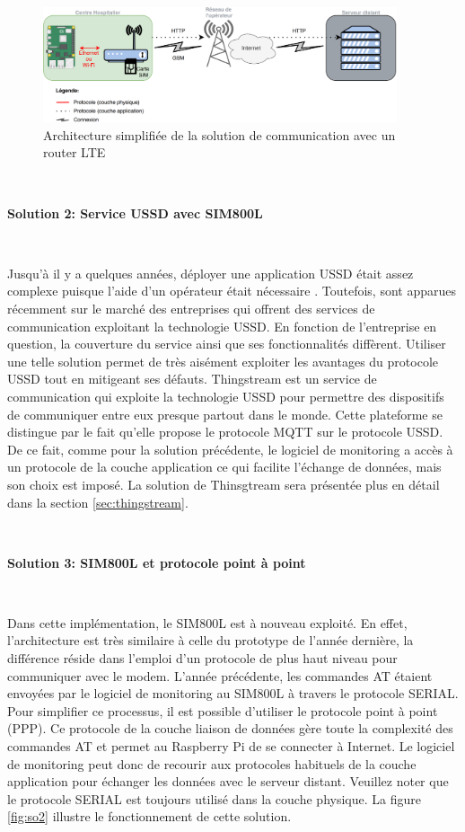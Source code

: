 \begin{figure}[ht!]
  \centering
  \includegraphics[width=0.93\textwidth]{img/el_prototype/solution1_com.png}
  \caption{Architecture simplifiée de la solution de communication avec un router LTE}
  \label{fig:so1}
\end{figure}

~

\textbf{Solution 2: Service USSD avec SIM800L}

\vspace{-0.2cm}
~

\noindent
Jusqu'à il y a quelques années, déployer une application USSD était assez complexe puisque l'aide d'un opérateur était nécessaire \cite{perrier2015ussd}. Toutefois, sont apparues récemment sur le marché des entreprises qui offrent des services de communication exploitant la technologie USSD. En fonction de l'entreprise en question, la couverture du service ainsi que ses fonctionnalités diffèrent. Utiliser une telle solution permet de très aisément exploiter les avantages du protocole USSD tout en mitigeant ses défauts. Thingstream est un service de communication qui exploite la technologie USSD pour permettre des dispositifs de communiquer entre eux presque partout dans le monde. Cette plateforme se distingue par le fait qu'elle propose le protocole MQTT sur le protocole USSD. De ce fait, comme pour la solution précédente, le logiciel de monitoring a accès à un protocole de la couche application ce qui facilite l'échange de données, mais son choix est imposé. La solution de Thinsgtream sera présentée plus en détail dans la section \ref{sec:thingstream}.

~

\textbf{Solution 3: SIM800L et protocole point à point}

\vspace{-0.2cm}
~

\noindent
Dans cette implémentation, le SIM800L est à nouveau exploité. En effet, l'architecture est très similaire à celle du prototype de l'année dernière, la différence réside dans l'emploi d'un protocole de plus haut niveau pour communiquer avec le modem. L'année précédente, les commandes AT étaient envoyées par le logiciel de monitoring au SIM800L à travers le protocole SERIAL. Pour simplifier ce processus, il est possible d'utiliser le protocole point à point (PPP). Ce protocole de la couche liaison de données gère toute la complexité des commandes AT et permet au Raspberry Pi de se connecter à Internet. Le logiciel de monitoring peut donc de recourir aux protocoles habituels de la couche application pour échanger les données avec le serveur distant. Veuillez noter que le protocole SERIAL est toujours utilisé dans la couche physique. La figure \ref{fig:so2} illustre le fonctionnement de cette solution.


